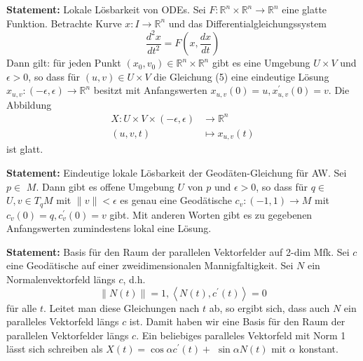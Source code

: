 \documentclass[10pt, letterpaper]{article}
\begin{document}
\textbf{Statement: }{Lokale Lösbarkeit von ODEs}.
Sei $F: \mathbb{R}^{n} \times \mathbb{R}^{n} \rightarrow \mathbb{R}^{n}$ eine glatte Funktion. Betrachte Kurve $x: I \rightarrow \mathbb{R}^{n}$ und das Differentialgleichungssystem
\begin{equation*}
\frac{d^{2} x}{d t^{2}}=F\left(x, \frac{d x}{d t}\right) \tag{5}
\end{equation*}
Dann gilt: für jeden Punkt $\left(x_{0}, v_{0}\right) \in \mathbb{R}^{n} \times \mathbb{R}^{n}$ gibt es eine Umgebung $U \times V$ und $\epsilon>0$, so dass für $(u, v) \in U \times V$ die Gleichung (5) eine eindeutige Lösung $x_{u, v}:(-\epsilon, \epsilon) \rightarrow \mathbb{R}^{n}$ besitzt mit Anfangswerten $x_{u, v}(0)=u, x_{u, v}^{\prime}(0)=v$. Die Abbildung
$$
\begin{aligned}
X: U \times V \times(-\epsilon, \epsilon) & \rightarrow \mathbb{R}^{n} \\
(u, v, t) & \mapsto x_{u, v}(t)
\end{aligned}
$$
ist glatt.

\StructurePic{}{}{%
  \begin{outline}
 
  \end{outline}
}

\vspace{0.8cm}


\textbf{Statement: }{Eindeutige lokale Lösbarkeit der Geodäten-Gleichung für AW}.
Sei $p \in$ $M$. Dann gibt es offene Umgebung $U$ von $p$ und $\epsilon>0$, so dass für $q \in$ $U, v \in T_{q} M$ mit $\|v\|<\epsilon$ es genau eine Geodätische $c_{v}:(-1,1) \rightarrow M$ mit $c_{v}(0)=q, c_{v}^{\prime}(0)=v$ gibt. Mit anderen Worten gibt es zu gegebenen Anfangswerten zumindestens lokal eine Lösung.

\StructurePic{}{}{%
  \begin{outline}
    
  \end{outline}
}

\vspace{0.8cm}


\textbf{Statement: }{Basis für den Raum der parallelen Vektorfelder auf 2-dim Mfk}.
Sei $c$ eine Geodätische auf einer zweidimensionalen Mannigfaltigkeit. Sei $N$ ein Normalenvektorfeld längs $c$, d.h. 
$$\|N(t)\|=1,\left\langle N(t), c^{\prime}(t)\right\rangle=0$$ 
für alle $t$. Leitet man diese Gleichungen nach $t$ ab, so ergibt sich, dass auch $N$ ein paralleles Vektorfeld längs $c$ ist. Damit haben wir eine Basis für den Raum der parallelen Vektorfelder längs $c$. Ein beliebiges paralleles Vektorfeld mit Norm 1 lässt sich schreiben als $X(t)=\cos \alpha c^{\prime}(t)+$ $\sin \alpha N(t)$ mit $\alpha$ konstant.
\end{document}
